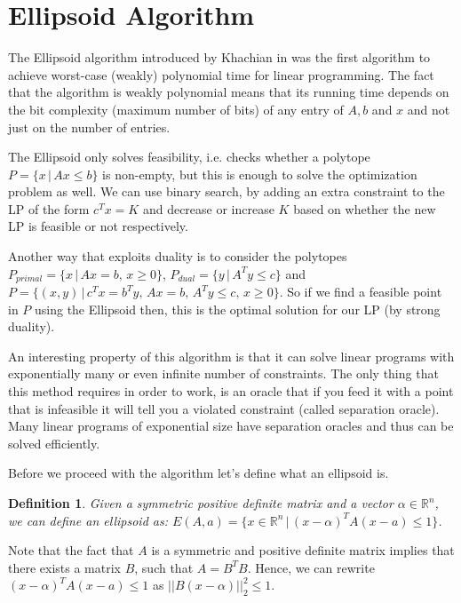 \documentclass[11pt]{article}
\newtheorem{definition}[theorem]{Definition}
\begin{document}
\section{Ellipsoid Algorithm}

The Ellipsoid algorithm introduced by Khachian in \cite{Khachian79} was the first algorithm to achieve worst-case (weakly) polynomial time for linear programming. The fact that the algorithm is weakly polynomial means that its running time depends on the bit complexity (maximum number of bits) of any entry of $A, b$ and $x$ and not just on the number of entries.

The Ellipsoid only solves feasibility, i.e. checks whether a polytope $P = \{x \,|\, Ax \leq b\}$ is non-empty, but this is enough to solve the optimization problem as well. We can use binary search, by adding an extra constraint to the LP of the form $c^Tx = K$ and decrease or increase $K$ based on whether the new LP is feasible or not respectively.

Another way that exploits duality is to consider the polytopes $P_{primal} = \{x\,|\, Ax = b,\, x \geq 0\}$, $P_{dual} = \{y\,|\,A^Ty \leq c\}$ and $P = \{(x,y)\,|\, c^Tx = b^Ty,\,Ax= b,\, A^Ty \leq c,\, x \geq 0\}$. So if we find a feasible point in $P$ using the Ellipsoid then, this is the optimal solution for our LP (by strong duality).

An interesting property of this algorithm is that it can solve linear programs with exponentially many or even infinite number of constraints. The only thing that this method requires in order to work, is an oracle that if you feed it with a point that is infeasible it will tell you a violated constraint (called separation oracle). Many linear programs of exponential size have separation oracles and thus can be solved efficiently.

Before we proceed with the algorithm let's define what an ellipsoid is.


\begin{definition}
Given a symmetric positive definite matrix and a vector $\alpha \in \mathbb{R}^n$, we can define an ellipsoid as: $E(A,a) = \{x \in \mathbb{R}^n\,|\, (x - \alpha)^TA(x-a) \leq 1\}$.
\end{definition}

Note that the fact that $A$ is a symmetric and positive definite matrix implies that there exists a matrix $B$, such that $A = B^TB$. Hence, we can rewrite $(x - \alpha)^TA(x-a) \leq 1$ as $||B(x-\alpha)||_2^2 \leq 1$.
\end{document}
